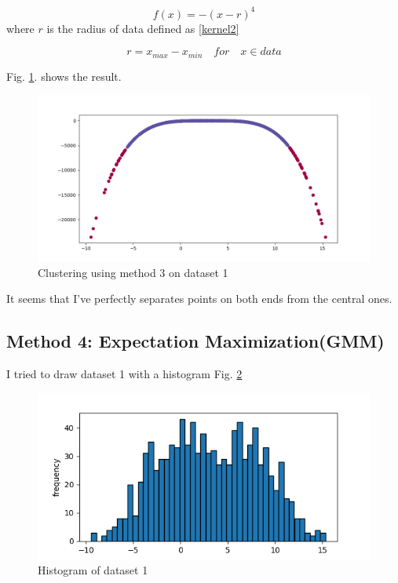 \documentclass[conference]{IEEEtran}
\begin{document}
\begin{equation}
	f(x) = -\left(x-r\right)^4
	\label{kernel1}
\end{equation}
where $r$ is the radius of data defined as \ref{kernel2}

\begin{equation}
	r = x_{max} - x_{min} \quad for \quad x \in data
	\label{kernel2}
\end{equation}

Fig. \ref{m3p1}. shows the result.


\begin{figure}[htbp]
	\centerline{\includegraphics[scale=0.35]{m3p1.png}}
	\caption{Clustering using method 3 on dataset 1}
	\label{m3p1}
\end{figure}

It seems that I've perfectly separates points on both ends from the central ones.
\subsection{Method 4: Expectation Maximization(GMM)}
I tried to draw dataset 1 with a histogram Fig. \ref{his}

\begin{figure}[htbp]
	\centerline{\includegraphics[scale=0.6]{his.png}}
	\caption{Histogram of dataset 1}
	\label{his}
\end{figure}
\end{document}

